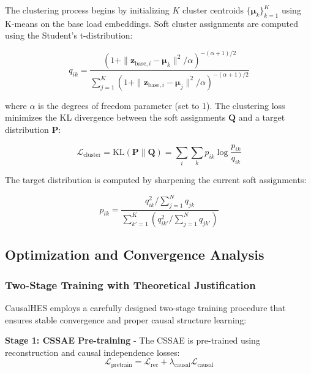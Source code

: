 \documentclass[journal]{IEEEtran}
\begin{document}
The clustering process begins by initializing $K$ cluster centroids $\{\boldsymbol{\mu}_k\}_{k=1}^K$ using K-means on the base load embeddings. Soft cluster assignments are computed using the Student's t-distribution:

\begin{equation}
q_{ik} = \frac{(1 + \|\mathbf{z}_{\text{base},i} - \boldsymbol{\mu}_k\|^2 / \alpha)^{-(\alpha+1)/2}}{\sum_{j=1}^K (1 + \|\mathbf{z}_{\text{base},i} - \boldsymbol{\mu}_j\|^2 / \alpha)^{-(\alpha+1)/2}}
\label{eq:soft_assignment_causal}
\end{equation}

where $\alpha$ is the degrees of freedom parameter (set to 1). The clustering loss minimizes the KL divergence between the soft assignments $\mathbf{Q}$ and a target distribution $\mathbf{P}$:

\begin{equation}
\mathcal{L}_{\text{cluster}} = \text{KL}(\mathbf{P} \| \mathbf{Q}) = \sum_i \sum_k p_{ik} \log \frac{p_{ik}}{q_{ik}}
\label{eq:clustering_loss_causal}
\end{equation}

The target distribution is computed by sharpening the current soft assignments:

\begin{equation}
p_{ik} = \frac{q_{ik}^2 / \sum_{j=1}^N q_{jk}}{\sum_{k'=1}^K (q_{ik'}^2 / \sum_{j=1}^N q_{jk'})}
\label{eq:target_distribution_causal}
\end{equation}

\subsection{Optimization and Convergence Analysis}

\subsubsection{Two-Stage Training with Theoretical Justification}

CausalHES employs a carefully designed two-stage training procedure that ensures stable convergence and proper causal structure learning:

\textbf{Stage 1: CSSAE Pre-training} - The CSSAE is pre-trained using reconstruction and causal independence losses:
\begin{equation}
\mathcal{L}_{\text{pretrain}} = \mathcal{L}_{\text{rec}} + \lambda_{\text{causal}} \mathcal{L}_{\text{causal}}
\label{eq:pretrain_loss}
\end{equation}
\end{document}
